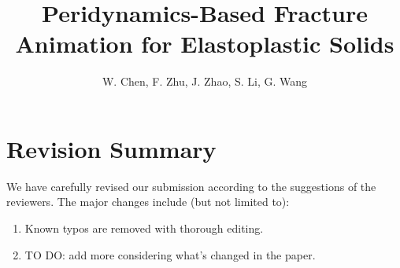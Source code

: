 

\title[Peridynamics-Based Fracture Animation for Elastoplastic Solids]%
      {Peridynamics-Based Fracture Animation for Elastoplastic Solids}

\author[W. Chen et al.]{W. Chen, F. Zhu, J. Zhao,
  S. Li, G. Wang}



%



\maketitle

\section{Revision Summary}

We have carefully revised our submission according to the suggestions of the reviewers. The major changes include (but not limited to):
\begin{enumerate}
\item{Known typos are removed with thorough editing.}
\item{TO DO: add more considering what's changed in the paper.}
\end{enumerate}

